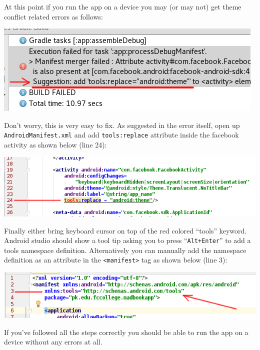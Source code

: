 At this point if you run the app on a device you may (or may not) get theme conflict related errors as follows:

\begin{center}
	\includegraphics[scale=\SourceCodeScale]{chapters/ch12/images/17}
\end{center}

Don't worry, this is very easy to fix. As suggested in the error itself, open up \texttt{AndroidManifest.xml} and add \texttt{tools:replace} attribute inside the facebook activity as shown below (line 24):

\begin{center}
	\includegraphics[scale=\SourceCodeScale]{chapters/ch12/images/18}
\end{center}

Finally either bring keyboard cursor on top of the red colored ``tools'' keyword. Android studio should show a tool tip asking you to press ``\texttt{Alt+Enter}'' to add a tools namespace definition. Alternatively you can manually add the namespace definition as an attribute in the \texttt{<manifest>} tag as shown below (line 3):

\begin{center}
	\includegraphics[scale=\SourceCodeScale]{chapters/ch12/images/19}
\end{center}

If you've followed all the steps correctly you should be able to run the app on a device without any errors at all.

